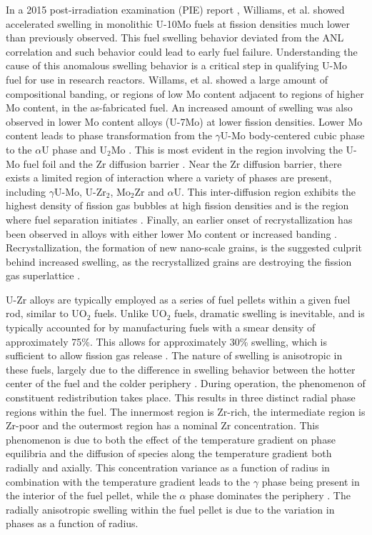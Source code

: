 \documentclass[review]{elsarticle}
\begin{document}
In a 2015 post-irradiation examination (PIE) report \cite{afip6report}, Williams, et al. showed accelerated swelling in monolithic U-10Mo fuels at fission densities much lower than previously observed. This fuel swelling behavior deviated from the ANL correlation and such behavior could lead to early fuel failure. Understanding the cause of this anomalous swelling behavior is a critical step in qualifying U-Mo fuel for use in research reactors. Willams, et al. \cite{afip6report} showed a large amount of compositional banding, or regions of low Mo content adjacent to regions of higher Mo content, in the as-fabricated fuel. An increased amount of swelling was also observed in lower Mo content alloys (U-7Mo) \cite{vandenberghe2014} at lower fission densities. Lower Mo content leads to phase transformation from the $\gamma$U-Mo body-centered cubic phase to the $\alpha$U phase and U$_{2}$Mo \cite{janfong2014}. This is most evident in the region involving the U-Mo fuel foil and the Zr diffusion barrier \cite{park2015}. Near the Zr diffusion barrier, there exists a limited region of interaction where a variety of phases are present, including $\gamma$U-Mo, U-Zr$_{2}$, Mo$_{2}$Zr and $\alpha$U. This inter-diffusion region exhibits the highest density of fission gas bubbles at high fission densities and is the region where fuel separation initiates \cite{rertr12}. Finally, an earlier onset of recrystallization has been observed in alloys with either lower Mo content or increased banding \cite{kim2013A}. Recrystallization, the formation of new nano-scale grains, is the suggested culprit behind increased swelling, as the recrystallized grains are destroying the fission gas superlattice \cite{vandenberghe2008}. 

U-Zr alloys are typically employed as a series of fuel pellets within a given fuel rod, similar to UO$_{2}$ fuels. Unlike UO$_{2}$ fuels, dramatic swelling is inevitable, and is typically accounted for by manufacturing fuels with a smear density of approximately 75{\%}. This allows for approximately 30\% swelling, which is sufficient to allow fission gas release \cite{beck1968}. The nature of swelling is anisotropic in these fuels, largely due to the difference in swelling behavior between the hotter center of the fuel and the colder periphery \cite{hofman1990}. During operation, the phenomenon of constituent redistribution takes place. This results in three distinct radial phase regions within the fuel. The innermost region is Zr-rich, the intermediate region is Zr-poor and the outermost region has a nominal Zr concentration. This phenomenon is due to both the effect of the temperature gradient on phase equilibria and the diffusion of species along the temperature gradient both radially and axially. This concentration variance as a function of radius in combination with the temperature gradient leads to the $\gamma$ phase being present in the interior of the fuel pellet, while the $\alpha$ phase dominates the periphery \cite{kobayashi1990, kim2004}. The radially anisotropic swelling within the fuel pellet is due to the variation in phases as a function of radius.
\end{document}
